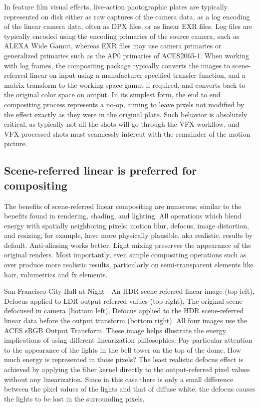 In feature film visual effects, live-action photographic plates are typically represented on disk either as raw captures of the camera data, as a log encoding of the linear camera data, often as DPX files, or as linear EXR files. Log files are typically encoded using the encoding primaries of the source camera, such as ALEXA Wide Gamut, whereas EXR files may use camera primaries or generalized primaries such as the AP0 primaries of ACES2065-1.  When working with log frames, the compositing package typically converts the images to scene-referred linear on input using a manufacturer specified transfer function, and a matrix transform to the working-space gamut if required, and converts back to the original color space on output. In its simplest form, the end to end compositing process represents a no-op, aiming to leave pixels not modified by the effect exactly as they were in the original plate. Such behavior is absolutely critical, as typically not all the shots will go through the VFX workflow, and VFX processed shots must seamlessly intercut with the remainder of the motion picture.

\subsection{Scene-referred linear is preferred for compositing}

The benefits of scene-referred linear compositing are numerous; similar to the benefits found in rendering, shading, and lighting. All operations which blend energy with spatially neighboring pixels: motion blur, defocus, image distortion, and resizing, for example, have more physically plausible, aka realistic, results by default. Anti-aliasing works better. Light mixing preserves the appearance of the original renders. Most importantly, even simple compositing operations such as over produce more realistic results, particularly on semi-transparent elements like hair, volumetrics and fx elements.


San Francisco City Hall at Night - An HDR scene-referred linear image (top left), Defocus applied to LDR output-referred values (top right), The original scene defocused in camera (bottom left), Defocus applied to the HDR scene-referred linear data before the output transform (bottom right). All four images use the ACES sRGB Output Transform.
These image helps illustrate the energy implications of using different linearization philosophies. Pay particular attention to the appearance of the lights in the bell tower on the top of the dome. How much energy is represented in those pixels? The least realistic defocus effect is achieved by applying the filter kernel directly to the output-referred pixel values without any linearization. Since in this case there is only a small difference between the pixel values of the lights and that of diffuse white, the defocus causes the lights to be lost in the surrounding pixels. 


